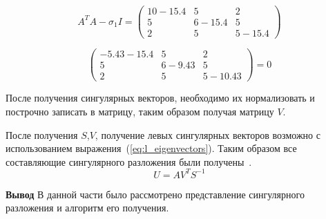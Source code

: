 \begin{equation}
	A^{T}A - \sigma_{1}I = \begin{pmatrix}
		10 - 15.4 & 5 & 2\\ 
		5 & 6 -15.4  &5\\
		2 & 5 & 5 - 15.4
	\end{pmatrix}
	\label{eq:r_eigenvectors_2}
\end{equation}

\begin{equation}
	\begin{pmatrix}
		-5.43 - 15.4 & 5 & 2\\ 
		5 & 6 -9.43  &5\\
		2 & 5 & 5 - 10.43
	\end{pmatrix} = 0
	\label{eq:r_eigenvectors_3}
\end{equation}

После получения сингулярных векторов, необходимо их нормализовать и построчно записать  в матрицу, таким образом получая матрицу $V$.

После получения $S$,$V$, получение левых сингулярных векторов возможно с использованием выражения~(\ref{eq:l_eigenvectors}). Таким образом все составляющие сингулярного разложения были получены~\cite{SVD_algo}.
\begin{equation}
	U = AV^{T}S^{-1}
	\label{eq:l_eigenvectors}
\end{equation}















\textbf{Вывод}
В данной части было рассмотрено представление сингулярного разложения и алгоритм его получения.
